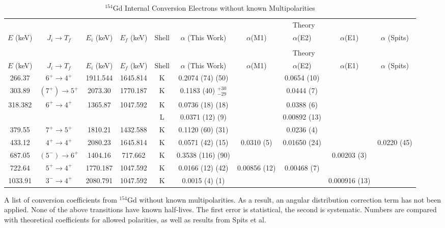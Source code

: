\begin{sidewaystable}
    \begin{longtable}{c|c|c|c|c|c|c|c|c|c}
        \caption{$^{154}$Gd Internal Conversion Electrons without known Multipolarities}
        \label{tab:154Gd_No_Mult_ICC}\\
        \toprule
        &	& 	&  &	& & \multicolumn{3}{c|}{Theory}	& 	\\ 
        $E$ (keV)	& $J_i\rightarrow T_f$ & $E_i$ (keV)	&	$E_f$ (keV)	& Shell & 		$\alpha$ (This Work)	& $\alpha$(M1) & $\alpha$(E2) & $\alpha$(E1) &	$\alpha$ (Spits)	\\
        \hline
        \endfirsthead
        \toprule
        \caption[]{$^{154}$Gd Internal Conversion Electrons without known Multipolarities}\\
        &	& 	&  &	& & \multicolumn{3}{c|}{Theory}	& 	\\ 
        $E$ (keV)	& $J_i\rightarrow T_f$ & $E_i$ (keV)	&	$E_f$ (keV)	& Shell &		$\alpha$ (This Work)	& $\alpha$(M1) & $\alpha$(E2) & $\alpha$(E1) &	$\alpha$ (Spits)	\\
	    \endhead
	    \hline
	    266.37	&	$6^+	\rightarrow	4^+$	&	1911.544	&	1645.814		& K &	0.2074	(74) (50) &  & 0.0654 (10) & & \\ \hline
	    303.89	&	$(7^+)	\rightarrow	5^+$	&	2073.30	&	1770.187	& K &	0.1183	(40) $^{+30}_{-29}$  & & 0.0444 (7) & & \\ \hline
	    318.382	&	$6^+	\rightarrow	4^+$	&	1365.87	&	1047.592	& K &	0.0736	(18) (18)  & & 0.0388 (6) & &\\
	    &		&		&		& L & 	0.0371	(12) (9) &	& 0.00892 (13) & &	\\  \hline
	    379.55	&	$7^+	\rightarrow	5^+$	&	1810.21	&	1432.588	& K & 	0.1120	(60) (31) &  & 0.0236 (4) & & \\ \hline
        433.12	&	$4^+	\rightarrow	4^+$	&	2080.23	&	1645.814	& K &	0.0571	(42) (15) & 0.0310 (5) & 0.01650 (24) &	& 0.0220 (45)\\ \hline
        687.05	&	$(5^-) \rightarrow 6^+$		&	1404.16	&	717.662 & K & 0.3538	(116) (90)	& & & 0.00203 (3) &\\ \hline
        722.64	&	$5^+	\rightarrow	4^+$	&	1770.187	&	1047.592 & K		&	0.0166	(12) (42)	& 0.00856 (12) & 0.00468 (7) & &		\\ \hline
        1033.91	&	$3^-	\rightarrow	4^+$	&	2080.791	&	1047.592 & K	&	0.0015	(4) (1)	& & & 0.000916 (13) &	\\
        \bottomrule
	\end{longtable}
    \item{A list of conversion coefficients from $^{154}$Gd without known multipolarities. As a result, an angular distribution correction term has not been applied. None of the above transitions have known half-lives. The first error is statistical, the second is systematic. Numbers are compared with theoretical coefficients for allowed polarities, as well as results from Spits et al.}
\end{sidewaystable}